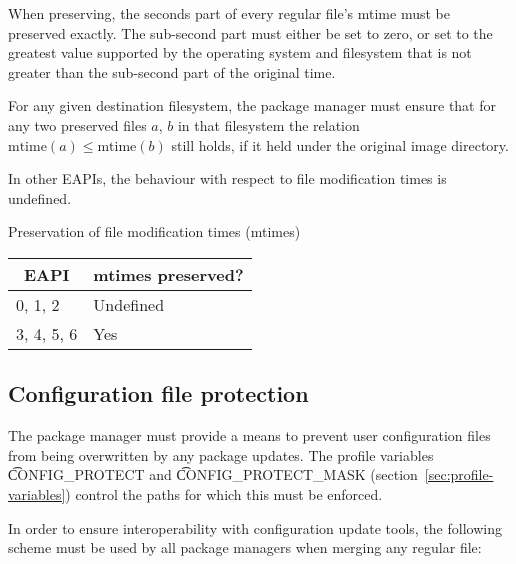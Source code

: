 When preserving, the seconds part of every regular file's mtime must
be preserved exactly. The sub-second part must either be set to zero,
or set to the greatest value supported by the operating system and
filesystem that is not greater than the sub-second part of the
original time.

For any given destination filesystem, the package manager must ensure
that for any two preserved files $a$, $b$ in that filesystem the
relation $\mbox{mtime}(a) \leq \mbox{mtime}(b)$ still holds, if it
held under the original image directory.

In other EAPIs, the behaviour with respect to file modification times
is undefined.

\begin{centertable}{Preservation of file modification times (mtimes)}
    \label{tab:mtime-preserve}
    \begin{tabular}{ll}
      \toprule
      \multicolumn{1}{c}{\textbf{EAPI}} &
      \multicolumn{1}{c}{\textbf{mtimes preserved?}} \\
      \midrule
      0, 1, 2           & Undefined \\
      3, 4, 5, 6        & Yes       \\
      \bottomrule
    \end{tabular}
\end{centertable}

\subsection{Configuration file protection}
\label{sec:config-protect}

The package manager must provide a means to prevent user configuration files from being
overwritten by any package updates. The profile variables \t{CONFIG\_PROTECT} and
\t{CONFIG\_PROTECT\_MASK} (section~\ref{sec:profile-variables}) control the paths for which this
must be enforced.

In order to ensure interoperability with configuration update tools, the following scheme must be
used by all package managers when merging any regular file:

